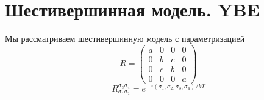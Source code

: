 \documentclass[12pt]{article}
\theoremstyle{definition}
\begin{document}
\section{Шестивершинная модель. YBE}
Мы рассматриваем шестивершинную модель с параметризацией
\begin{equation}
    R=\begin{pmatrix}
        a & 0 & 0 & 0\\
        0 & b & c & 0\\
        0 & c & b & 0\\
        0 & 0 & 0 & a
    \end{pmatrix}
\end{equation}
\begin{equation}
    R_{\sigma_1\sigma_2}^{\sigma_3\sigma_4}=e^{-\varepsilon(\sigma_1,\sigma_2,\sigma_3,\sigma_4)/kT}
\end{equation}
\end{document}
